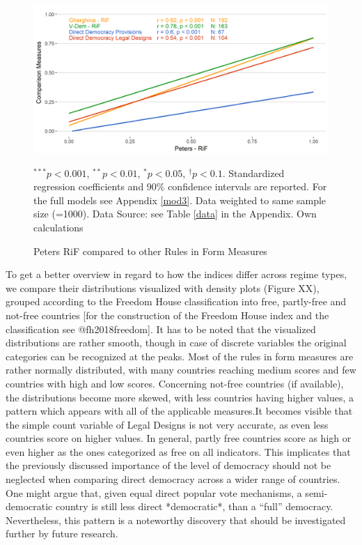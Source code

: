 \documentclass{systats}
\begin{document}
\begin{figure}
	\caption{Peters RiF compared to other Rules in Form Measures}
	\label{reg2}
	\includegraphics[width=\textwidth]{images/rif_peters.png}
	\flushright
	{\scriptsize $^{***}p<0.001$, $^{**}p<0.01$, $^*p<0.05$, $^{\dagger}p<0.1$. Standardized regression coefficients and 90\% confidence intervals are reported. For the full models see Appendix \ref{mod3}. Data weighted to same sample size (=1000). Data Source: see Table \ref{data} in the Appendix. Own calculations  \par}
\end{figure}



To get a better overview in regard to how the indices differ across regime types, we compare their distributions visualized with density plots (Figure XX), grouped according to the Freedom House classification into free, partly-free and not-free countries [for the construction of the Freedom House index and the classification see @fh2018freedom].  It has to be noted that the visualized distributions are rather smooth, though in case of discrete variables the original categories can be recognized at the peaks. Most of the rules in form measures are rather normally distributed, with many countries  reaching medium scores and few countries with high and low scores. Concerning not-free countries (if available), the distributions become more skewed, with less countries having higher values, a pattern which appears with all of the applicable measures.It becomes visible that the simple count variable of Legal Designs is not very accurate, as even less countries score on higher values. In general, partly free countries score as high or even higher as the ones categorized as free on all indicators. This implicates that the previously discussed importance of the level of democracy should not be neglected when comparing direct democracy across a wider range of countries. One might argue that, given equal direct popular vote mechanisms, a semi-democratic country is still less direct *democratic*, than a “full” democracy. Nevertheless, this pattern is a noteworthy discovery that should be investigated further by future research.
\end{document}

